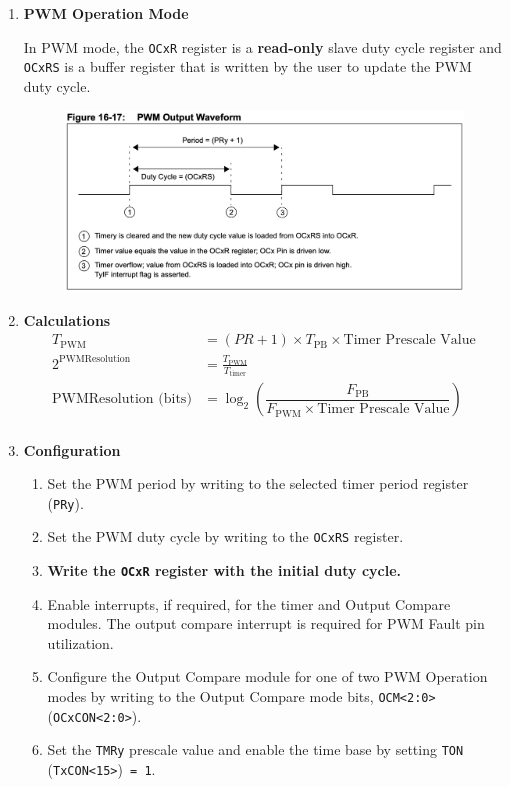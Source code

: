 \documentclass[a4paper]{article}
\begin{document}
\begin{enumerate}[label = \arabic*.]
    \item \textbf{PWM Operation Mode}
      \par In PWM mode, the \verb|OCxR| register is a \textbf{read-only} slave duty cycle register and \verb|OCxRS| is a buffer register that is written by the user to update the PWM duty cycle.

      \begin{figure}[H]
        \centering
        \includegraphics[width=0.8\linewidth]{PWM_output_waveform.png}
        \label{fig:PWM_output_waveform.png}
      \end{figure}

    \item \textbf{Calculations}
      \begin{equation*}
        \begin{aligned}
          T_{\text{PWM}}                      & = (PR + 1) \times T_{\text{PB}}  \times \text{Timer Prescale Value}                                \\
          2^{\text{PWMResolution}}            & = \frac{T_{\text{PWM}}}{T_{\text{timer}} }                                                         \\
          \text{PWMResolution} \text{ (bits)} & = \log_2 \left( \dfrac{F_{\text{PB}} }{F_{\text{PWM}} \times \text{Timer Prescale Value}}  \right) \\
        \end{aligned}
      \end{equation*}

    \item \textbf{Configuration}
      \begin{enumerate}[label = \arabic*.]
        \item Set the PWM period by writing to the selected timer period register (\verb|PRy|).
        \item Set the PWM duty cycle by writing to the \verb|OCxRS| register.
        \item \cprotect\textbf{Write the \verb|OCxR| register with the initial duty cycle.}
        \item Enable interrupts, if required, for the timer and Output Compare modules. The output compare interrupt is required for PWM Fault pin utilization.
        \item Configure the Output Compare module for one of two PWM Operation modes by writing to the Output Compare mode bits, \verb|OCM<2:0>| (\verb|OCxCON<2:0>|).
        \item Set the \verb|TMRy| prescale value and enable the time base by setting \verb|TON| (\verb|TxCON<15>|)\verb| = 1|.
      \end{enumerate}
  \end{enumerate}
\end{document}
